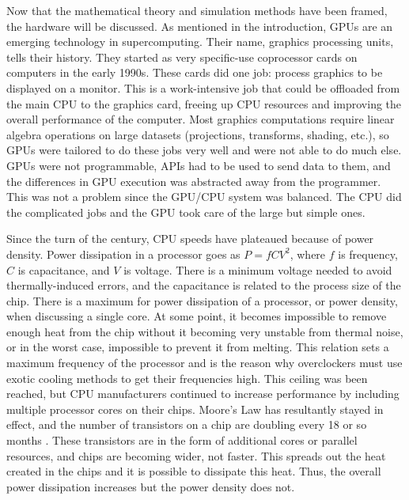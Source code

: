 Now that the mathematical theory and simulation methods have been framed, the hardware will be discussed.  As mentioned in the introduction, GPUs are an emerging technology in supercomputing.  Their name, graphics processing units, tells their history.  They started as very specific-use coprocessor cards on computers in the early 1990s.  These cards did one job:  process graphics to be displayed on a monitor. This is a work-intensive job that could be offloaded from the main CPU to the graphics card, freeing up CPU resources and improving the overall performance of the computer.  Most graphics computations require linear algebra operations on large datasets (projections, transforms, shading, etc.), so GPUs were tailored to do these jobs very well and were not able to do much else.  GPUs were not programmable, APIs had to be used to send data to them, and the differences in GPU execution was abstracted away from the programmer. %
  This was not a problem since the GPU/CPU system was balanced.  The CPU did the complicated jobs and the GPU took care of the large but simple ones.  
  
Since the turn of the century, CPU speeds have plateaued because of power density.  Power dissipation in a processor goes as $P=fCV^2$, where $f$ is frequency, $C$ is capacitance, and $V$ is voltage.  There is a minimum voltage needed to avoid thermally-induced errors, and the capacitance is related to the process size of the chip.  There is a maximum for power dissipation of a processor, or power density, when discussing a single core.  At some point, it becomes impossible to remove enough heat from the chip without it becoming very unstable from thermal noise, or in the worst case, impossible to prevent it from melting. %
  This relation sets a maximum frequency of the processor and is the reason why overclockers must use exotic cooling methods to get their frequencies high.  This ceiling was been reached, but CPU manufacturers continued to increase performance by including multiple processor cores on their chips.  Moore's Law has resultantly stayed in effect, and the number of transistors on a chip are doubling every 18 or so months \cite{moore}.  
 These transistors are in the form of additional cores or parallel resources, and chips are becoming wider, not faster.  This spreads out the heat created in the chips and it is possible to dissipate this heat.  Thus, the overall power dissipation increases but the power density does not.  

